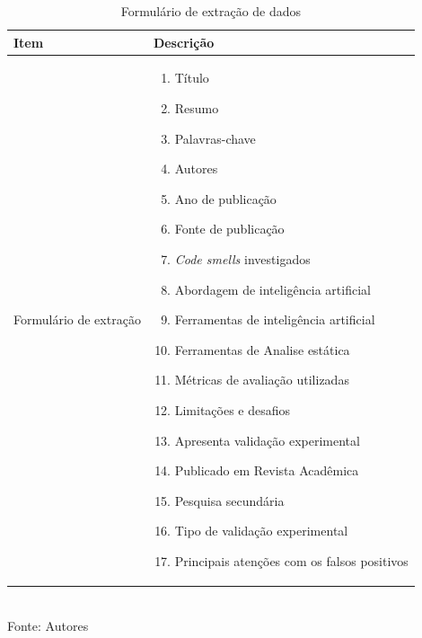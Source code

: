 \clearpage
\begin{table}[H]
    \centering
    \caption{Formulário de extração de dados}
    \label{tab:form_extracao}
    \begin{tabular}{|p{4cm}|p{9cm}|}
        \hline
        \textbf{Item} & \textbf{Descrição} \\
        \hline
        Formulário de extração &
        \begin{enumerate}[leftmargin=*, label=\arabic*.]
            \item Título
            \item Resumo
            \item Palavras-chave
            \item Autores
            \item Ano de publicação
            \item Fonte de publicação
            \item \textit{Code smells} investigados
            \item Abordagem de inteligência artificial
            \item Ferramentas de inteligência artificial
            \item Ferramentas de Analise estática
            \item Métricas de avaliação utilizadas
            \item Limitações e desafios
            \item Apresenta validação experimental
            \item Publicado em Revista Acadêmica
            \item Pesquisa secundária
            \item Tipo de validação experimental
            \item Principais atenções com os falsos positivos
        \end{enumerate} \\
        \hline
    \end{tabular}\\[0.4em]
    \small Fonte: Autores
\end{table}


